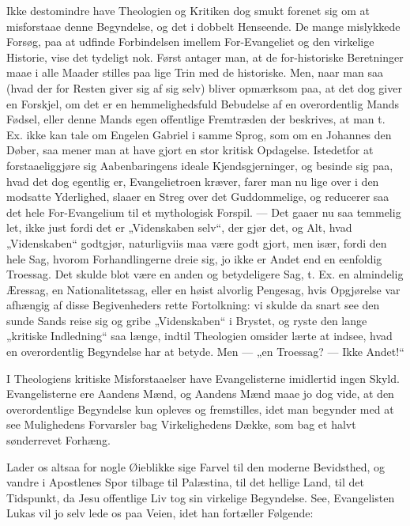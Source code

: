 \documentclass[12pt,a4paper]{book}
\begin{document}
Ikke destomindre have Theologien og Kritiken dog smukt forenet sig om at
misforstaae denne Begyndelse, og det i dobbelt Henseende. De mange mislykkede
Forsøg, paa at udfinde Forbindelsen
imellem For-Evangeliet og den virkelige Historie, vise det tydeligt nok. Først
antager man, at de for-historiske Beretninger maae i alle Maader stilles paa
lige Trin med de historiske. Men, naar man saa (hvad der for Resten giver sig af
sig selv) bliver opmærksom paa, at det dog giver en Forskjel, om det er en
hemmelighedsfuld Bebudelse af en overordentlig Mands Fødsel, eller denne Mands
egen offentlige Fremtræden der beskrives, at man t. Ex. ikke kan tale om Engelen
Gabriel i samme Sprog, som om en Johannes den Døber, saa mener man at have gjort
en stor kritisk Opdagelse. Istedetfor at forstaaeliggjøre sig Aabenbaringens
ideale Kjendsgjerninger, og besinde sig paa, hvad det dog egentlig er,
Evangelietroen kræver, farer man nu lige over i den modsatte Yderlighed, slaaer
en Streg over det Guddommelige, og reducerer saa det hele For-Evangelium til et
mythologisk Forspil. --- Det gaaer nu saa temmelig let, ikke just fordi det er
„Videnskaben selv“, der gjør det, og Alt, hvad „Videnskaben“ godtgjør,
naturligviis maa være godt gjort, men især, fordi den hele Sag, hvorom
Forhandlingerne dreie sig, jo ikke er Andet end en eenfoldig Troessag. Det
skulde blot være en anden og betydeligere Sag, t. Ex. en almindelig Æressag, en
Nationalitetssag, eller en høist alvorlig Pengesag, hvis Opgjørelse var
afhængig af disse Begivenheders rette Fortolkning: vi skulde da snart see den
sunde Sands reise sig og gribe „Videnskaben“ i Brystet, og ryste den lange
„kritiske Indledning“ saa længe, indtil Theologien omsider lærte at indsee, hvad
en overordentlig Begyndelse har at betyde. Men --- „en Troessag? --- Ikke
Andet!“

I Theologiens kritiske Misforstaaelser have Evangelisterne imidlertid ingen
Skyld. Evangelisterne ere Aandens Mænd, og Aandens Mænd maae jo dog vide, at den
overordentlige Begyndelse kun opleves og fremstilles, idet man begynder med at
see Mulighedens Forvarsler bag Virkelighedens Dække, som bag et halvt
sønderrevet Forhæng.

Lader os altsaa for nogle Øieblikke sige Farvel til den moderne Bevidsthed, og
vandre i Apostlenes Spor tilbage til Palæstina, til det hellige Land, til det
Tidspunkt, da Jesu offentlige Liv tog sin virkelige Begyndelse. See,
Evangelisten Lukas vil jo selv lede os paa Veien, idet han fortæller Følgende:
\end{document}
